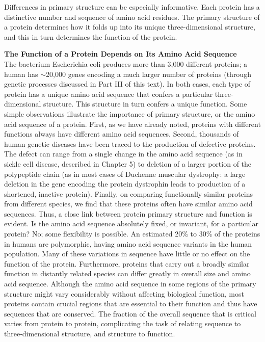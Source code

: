 Differences in primary structure can be especially informative. Each protein has a distinctive number and sequence of amino acid residues. The primary structure of a protein determines how it folds up into its unique three-dimensional structure, and this in turn determines the function of the protein.

\textbf{The Function of a Protein Depends on Its Amino Acid Sequence}\\
The bacterium Escherichia coli produces more than 3,000 different proteins; a human has $\sim$20,000 genes encoding a much larger number of proteins (through genetic processes discussed in Part III of this text). In both cases, each type of protein has a unique amino acid sequence that confers a particular three-dimensional structure. This structure in turn confers a unique function. Some simple observations illustrate the importance of primary structure, or the amino acid sequence of a protein. First, as we have already noted, proteins with different functions always have different amino acid sequences. Second, thousands of human genetic diseases have been traced to the production of defective proteins. The defect can range from a single change in the amino acid sequence (as in sickle cell disease, described in Chapter 5) to deletion of a larger portion of the polypeptide chain (as in most cases of Duchenne muscular dystrophy: a large deletion in the gene encoding the protein dystrophin leads to production of a shortened, inactive protein). 
Finally, on comparing functionally similar proteins from different species, we find that these proteins often have similar amino acid sequences.
Thus, a close link between protein primary structure and function is evident. Is the amino acid sequence absolutely fixed, or invariant, for a particular protein? No; some flexibility is possible. An estimated 20\% to 30\% of the proteins in humans are polymorphic, having amino acid sequence variants in the human population. Many of these variations in sequence have little or no effect on the function of the protein. Furthermore, proteins that carry out a broadly similar function in distantly related species can differ greatly in overall size and amino acid sequence. Although the amino acid sequence in some regions of the primary structure might vary considerably without affecting biological function, most proteins contain crucial regions that are essential to their function and thus have sequences that are conserved. The fraction of the overall sequence that is critical varies from protein to protein, complicating the task of relating sequence to three-dimensional structure, and structure to function. 

